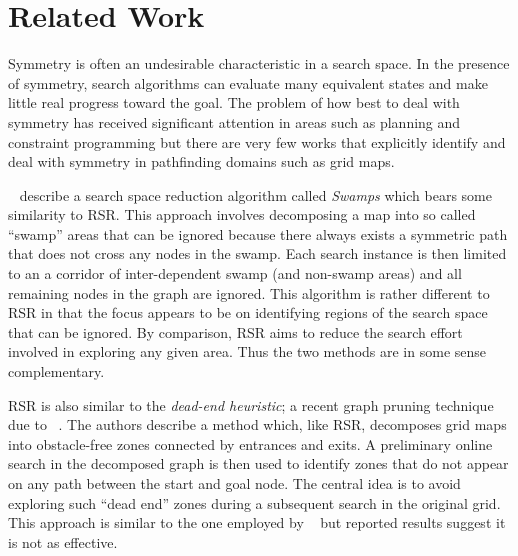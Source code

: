 \section{Related Work}
\label{sec:relatedwork}
Symmetry is often an undesirable characteristic in a search space.
In the presence of symmetry, search algorithms can evaluate many equivalent
states and make little real progress toward the goal.
The problem of how best to deal with symmetry has received significant attention 
in areas such as planning \cite{fox99} and constraint programming \cite{gent00} 
but there are very few works that explicitly identify and deal with symmetry in 
pathfinding domains such as grid maps. 
\par
\citeauthor{pochter10}~ describe a search space
reduction algorithm called \emph{Swamps} which bears some similarity to RSR.
This approach involves decomposing a map into so called ``swamp'' areas that can
be ignored because there always exists a symmetric path that does not cross any
nodes in the swamp. Each search instance is then limited to an a corridor of
inter-dependent swamp (and non-swamp areas) and all remaining nodes in the graph
are ignored. This algorithm is rather different to RSR in that the focus appears
to be on identifying regions of the search space that can be ignored.  
By comparison, RSR aims to reduce the search effort involved in exploring any
given area. Thus the two methods are in some sense complementary.
\par
RSR is also similar to the \emph{dead-end heuristic}; a recent graph pruning
technique due to \citeauthor{bjornsson06}~.
The authors describe a method which, like RSR, decomposes grid maps into
obstacle-free zones connected by entrances and exits.  A preliminary online
search in the decomposed graph is then used to identify zones that do not appear
on any path between the start and goal node. The central idea is to avoid
exploring such ``dead end'' zones during a subsequent search in the original grid. 
This approach is similar to the one employed by
\citeauthor{pochter10}~ but reported results suggest it is
not as effective.

